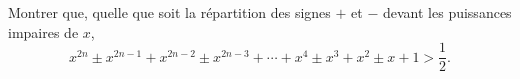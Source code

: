 Montrer que, quelle que soit la répartition des signes $+$ et $-$ devant les puissances impaires de $x$,
\[ x^{2n} \pm x^{2n-1} + x^{2n-2} \pm x^{2n-3} + \cdots + x^4 \pm x^3 + x^2 \pm x + 1 > \frac{1}{2}. \]
